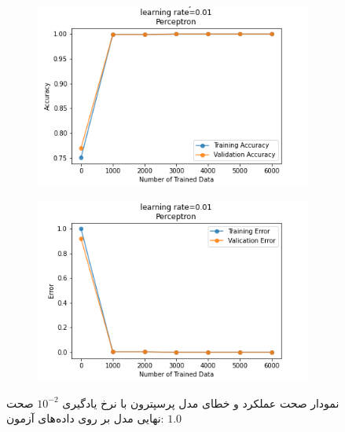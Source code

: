 \documentclass[12pt, a4paper]{article}
\begin{document}
\begin{figure}[h]
    \begin{subfigure}{0.45\linewidth}
        \centering
        \includegraphics[width=\linewidth]{images/3/perceptron/lr/acc_0.01.png}
    \end{subfigure}
    \hfil
    \begin{subfigure}{0.45\linewidth}
        \centering
        \includegraphics[width=\linewidth]{images/3/perceptron/lr/error_0.01.png}
    \end{subfigure}
    \caption{نمودار صحت عملکرد‌ و خطای مدل پرسپترون با نرخ یادگیری $10^{-2}$
    \newline
    صحت نهایی مدل بر روی داده‌های آزمون: $1.0$}
\end{figure}
\end{document}
